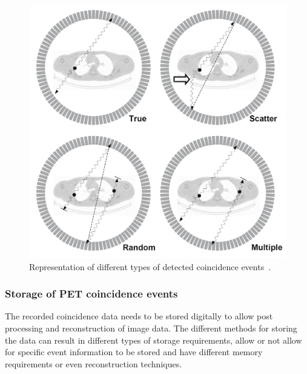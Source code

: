 \begin{figure} [h!]
\centering
\includegraphics[scale=0.30,angle=0]{2_Theory_Methods/figures/Bailey_Scatter_Random_events.png}
\caption{Representation of different types of detected coincidence events~\cite{Bailey2005}. } 
\label{fig_2:BlockDetectorAndRing}
\end{figure} 



\subsubsection{Storage of PET coincidence events}
The recorded coincidence data needs to be stored digitally to allow post processing and reconstruction of image data.
The different methods for storing the data can result in different types of storage requirements, allow or not allow for specific event information to be stored and have different memory requirements or even reconstruction techniques. 


